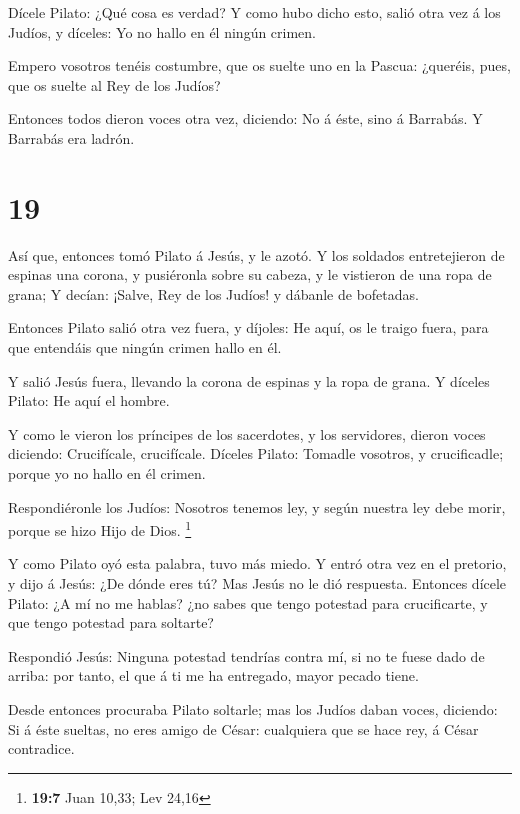  Dícele Pilato: ¿Qué cosa es verdad? Y como hubo dicho
esto, salió otra vez á los Judíos, y díceles: Yo no hallo en él ningún
crimen.

 Empero vosotros tenéis costumbre, que os suelte uno en la
Pascua: ¿queréis, pues, que os suelte al Rey de los Judíos?

 Entonces todos dieron voces otra vez, diciendo: No á éste,
sino á Barrabás. Y Barrabás era ladrón.

\hypertarget{section-18}{%
\section{19}\label{section-18}}

 Así que, entonces tomó Pilato á Jesús, y le azotó.
 Y los soldados entretejieron de espinas una corona, y
pusiéronla sobre su cabeza, y le vistieron de una ropa de grana;
 Y decían: ¡Salve, Rey de los Judíos! y dábanle de
bofetadas.

 Entonces Pilato salió otra vez fuera, y díjoles: He aquí,
os le traigo fuera, para que entendáis que ningún crimen hallo en él.

 Y salió Jesús fuera, llevando la corona de espinas y la
ropa de grana. Y díceles Pilato: He aquí el hombre.

 Y como le vieron los príncipes de los sacerdotes, y los
servidores, dieron voces diciendo: Crucifícale, crucifícale. Díceles
Pilato: Tomadle vosotros, y crucificadle; porque yo no hallo en él
crimen.

 Respondiéronle los Judíos: Nosotros tenemos ley, y según
nuestra ley debe morir, porque se hizo Hijo de Dios. \footnote{\textbf{19:7}
  Juan 10,33; Lev 24,16}

 Y como Pilato oyó esta palabra, tuvo más miedo.
 Y entró otra vez en el pretorio, y dijo á Jesús: ¿De dónde
eres tú? Mas Jesús no le dió respuesta.  Entonces dícele
Pilato: ¿A mí no me hablas? ¿no sabes que tengo potestad para
crucificarte, y que tengo potestad para soltarte?

 Respondió Jesús: Ninguna potestad tendrías contra mí, si
no te fuese dado de arriba: por tanto, el que á ti me ha entregado,
mayor pecado tiene.

 Desde entonces procuraba Pilato soltarle; mas los Judíos
daban voces, diciendo: Si á éste sueltas, no eres amigo de César:
cualquiera que se hace rey, á César contradice.

